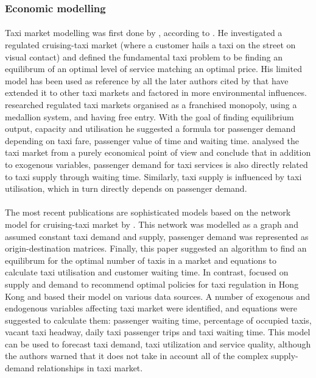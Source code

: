 \subsubsection{Economic modelling} 

\paragraph{}Taxi market modelling was first done by
\textcite{Douglas1972taxi+regulation}, according to
\textcite{Salanova2011taxi+review}. He investigated a regulated cruising-taxi
market (where a customer hails a taxi on the street on visual contact) and
defined the fundamental taxi problem to be finding an equilibrum of an optimal
level of service matching an optimal price. His limited model has been used as
reference by all the later authors cited by \textcite{Salanova2011taxi+review}
that have extended it to other taxi markets and factored in more environmental
influences. \textcite{Devany1975taxi+capacity} researched regulated taxi
markets organised as a franchised monopoly, using a medallion system, and
having free entry. With the goal of finding equilibrium output, capacity and
utilisation he suggested a formula tor passenger demand depending on taxi fare,
passenger value of time and waiting time. \textcite{Manski1967taxi+demand}
analysed the taxi market from a purely economical point of view and conclude
that in addition to exogenous variables, passenger demand for taxi services is
also directly related to taxi supply through waiting time. Similarly, taxi
supply is influenced by taxi utilisation, which in turn directly depends on
passenger demand.

\paragraph{}The most recent publications are sophisticated models based on the
network model for cruising-taxi market by \textcite{Yang1998taxi+network}. This
network was modelled as a graph and assumed constant taxi demand and supply,
passenger demand was represented as origin-destination matrices. Finally, this
paper suggested an algorithm to find an equilibrum for the optimal number of
taxis in a market and equations to calculate taxi utilisation and customer
waiting time. In contrast, \textcite{Yang2000taxi+utilization} focused on
supply and demand to recommend optimal policies for taxi regulation in Hong
Kong and based their model on various data sources. A number of exogenous and
endogenous variables affecting taxi market were identified, and equations were
suggested to calculate them: passenger waiting time, percentage of occupied
taxis, vacant taxi headway, daily taxi passenger trips and taxi waiting time.
This model can be used to forecast taxi demand, taxi utilization and service
quality, although the authors warned that it does not take in account all of
the complex supply-demand relationships in taxi market.

